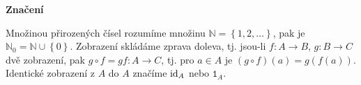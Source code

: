 
{}
\vspace{2em}
\begin{center}
{\bfseries\Large Značení}\par\vspace{1em}
\end{center}

Množinou přirozených čísel rozumíme množinu $\mathbb N =\left \{ 1,2,\dots \right \} $,
pak je $\mathbb N_0=\mathbb N \cup \left \{ 0 \right \} $.
Zobrazení skládáme zprava doleva, tj. jsou-li $f:A\to B$, $g: B\to C$ dvě zobrazení, pak
$g\circ f=gf:A\to C$, tj. pro $ a \in A$ je $(g\circ f)(a)=g(f(a))$. Identické zobrazení
z $A$ do $A$ značíme $\mathrm{id}_A$ nebo $\mathtt 1_A$.
